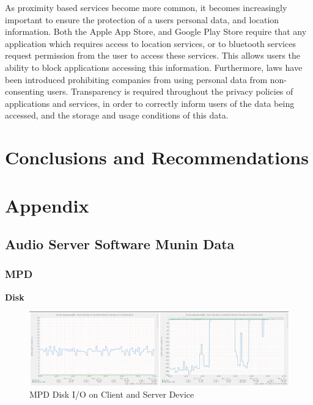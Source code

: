 \documentclass[11pt,a4paper,headinclude=false,footinclude=false]{scrreprt}
\begin{document}
As proximity based services become more common, it becomes increasingly
important to ensure the protection of a users personal data, and
location information. Both the Apple App Store, and Google Play Store
require that any application which requires access to location services,
or to bluetooth services request permission from the user to access
these services. This allows users the ability to block applications
accessing this information. Furthermore, laws have been introduced
prohibiting companies from using personal data from non-consenting
users\cite{proxmarketing}. Transparency is required throughout the
privacy policies of applications and services, in order to correctly
inform users of the data being accessed, and the storage and usage
conditions of this data.

\chapter{Conclusions and
Recommendations}\label{conclusions-and-recommendations}

\chapter{\texorpdfstring{Appendix
\label{Appendix}}{Appendix }}\label{appendix}

\section{Audio Server Software Munin
Data}\label{audio-server-software-munin-data}

\subsection{MPD}\label{mpd-2}

\textbf{Disk}

\begin{figure}[H]
\includegraphics{ResultsAndAnalysis/MPDServerTestImages/005MPDDiskIO.png}
\centering
\caption{MPD Disk I/O on Client and Server Device}
\label{MPDDiskIO}
\end{figure}
\end{document}
